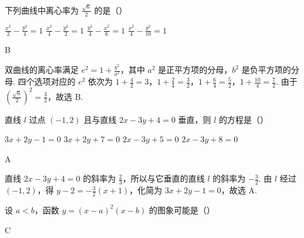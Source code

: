 \begin{problem}
下列曲线中离心率为 \(\frac{\sqrt{6}}{2}\) 的是（\quad）

\choices
    {\(\frac{x^2}{2} - \frac{y^2}{4} = 1\)}
    {\(\frac{x^2}{4} - \frac{y^2}{2} = 1\)}
    {\(\frac{y^2}{4} - \frac{x^2}{6} = 1\)}
    {\(\frac{x^2}{4} -\frac{y^2}{10} = 1\)}
\end{problem}

\begin{answer}
B
\end{answer}

\begin{solution}
双曲线的离心率满足 \(e^2=1+\frac{b^2}{a^2}\)，其中 \(a^2\) 是正平方项的分母，\(b^2\) 是负平方项的分母. 四个选项对应的 \(e^2\) 依次为 \(1+\frac{4}{2}=3\)，\(1+\frac{2}{4}=\frac{3}{2}\)，\(1+\frac{6}{4}=\frac{5}{2}\)，\(1+\frac{10}{4}=\frac{7}{2}\). 由于 \(\left(\frac{\sqrt{6}}{2}\right)^2=\frac{3}{2}\)，故选 B.
\end{solution}

\begin{problem}
直线 \(l\) 过点 \((-1,2)\) 且与直线 \(2x - 3y + 4 = 0\) 垂直，则 \(l\) 的方程是（\quad）

\choices
    {\(3x + 2y - 1 = 0\)}
    {\(3x + 2y + 7 = 0\)}
    {\(2x - 3y + 5 = 0\)}
    {\(2x - 3y + 8 = 0\)}
\end{problem}

\begin{answer}
A
\end{answer}

\begin{solution}
直线 \(2x-3y+4=0\) 的斜率为 \(\frac{2}{3}\)，所以与它垂直的直线 \(l\) 的斜率为 \(-\frac{3}{2}\). 由 \(l\) 经过 \((-1,2)\)，得 \(y-2=-\frac{3}{2}(x+1)\)，化简为 \(3x+2y-1=0\)，故选 A.
\end{solution}

\begin{problem}
设 \(a < b\)，函数 \(y = (x - a)^2 (x - b)\) 的图象可能是（\quad）

    {}
    {}
    {}
\end{problem}

\begin{answer}
C
\end{answer}

